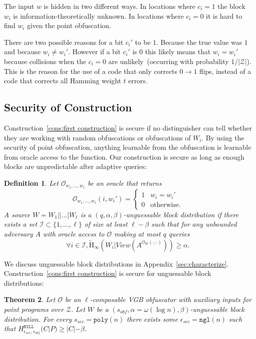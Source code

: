 \documentclass[11pt]{article}
\newcommand{\apref}[1]{\mbox{Appendix~\ref{#1}}}
\newcommand{\consref}[1]{\mbox{Construction~\ref{#1}}}
\newcommand{\hill}{\ensuremath{\mathtt{HILL}}\xspace}
\newcommand{\poly}{\ensuremath{\mathtt{poly}}\xspace}
\newcommand{\ngl}{\ensuremath{\mathtt{ngl}}\xspace}
\newcommand{\Hav}{\tilde{\mathrm{H}}_\infty}
\newtheorem{theorem}{Theorem}[section]
\newtheorem{definition}[theorem]{Definition}
\begin{document}
The input $w$ is hidden in two different ways.  In locations where $c_i=1$ the block $w_i$ is information-theoretically unknown.
In locations where $c_i=0$ it is hard to find $w_i$ given the point obfuscation.  %

There are two possible reasons for a bit $c_i'$ to be $1$.  Because the true value was $1$ and because $w_i \neq w_i'$.  However if a bit $c_i'$ is $0$ this likely means that $w_i=w_i'$ because collisions when the $c_i=0$ are unlikely~(occurring with probability $1/|\mathcal{Z}|$).  This is the reason for the use of a code that only corrects $0\rightarrow 1$ flips, instead of a code that corrects all Hamming weight $t$ errors.

\subsection{Security of Construction}
\label{sec:sec of construction}
\consref{cons:first construction} is secure if no distinguisher can tell whether they are working with random obfuscations or obfuscations of $W_i$.  By using the security of point obfuscation, anything learnable from the obfuscation is learnable from oracle access to the function.  Our construction is secure as long as enough blocks are unpredictable after adaptive queries:

\begin{definition}
\label{def:block guessable}
Let $\mathcal{O}_{w_1,..., w_\ell}$ be an oracle that returns \[\mathcal{O}_{w_1,..., w_\ell}(i, w_i')=
\begin{cases}
1 & w_i = w_i'\\
0 & \text{otherwise}.
\end{cases}
\]
A source $W = W_1||...|W_\ell$ is a $(q, \alpha, \beta)$-\emph{unguessable block distribution} if there exists a set $\mathcal{I}\subset\{1,..., \ell\}$ of size at least $\ell -\beta$ such that for any unbounded adversary $A$ with oracle access to $\mathcal{O}$ making at most $q$ queries
\[
\forall i\in \mathcal{I}, \Hav(W_i |View(A^{\mathcal{O}_{W}(\cdot, \cdot)}))\geq \alpha.
\]
\end{definition}

We discuss unguessable block distributions in \apref{sec:characterize}.  \consref{cons:first construction} is secure for unguessable block distributions:
\begin{theorem}
\label{thm:security of cons}
Let $\mathcal{O}$ be an $\ell$-composable VGB obfuscator with auxiliary inputs for point programs over $\mathcal{Z}$. 
Let $W$ be a $(s_{obf}, \alpha = \omega(\log n), \beta)$-unguessable block distribution.  For every $s_{sec} = \poly(n)$ there exists some $\epsilon_{sec} = \ngl(n)$ such that $H^{\hill}_{\epsilon_{sec}, s_{obf}}( C | P ) \geq |C| - \beta$.%
\end{theorem}
\end{document}
